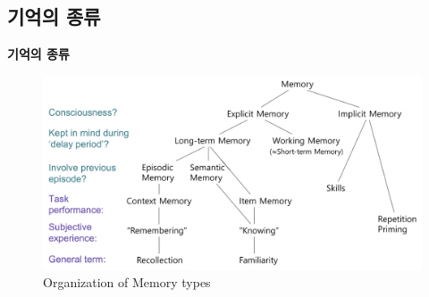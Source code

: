 \documentclass{beamer}
\begin{document}
\subsection{기억의 종류}
\begin{frame}{\textbf{기억의 종류}}

  \begin{figure}
    \centering
    \includegraphics[width=\textwidth]{image/memory_tree_2}
    \caption{Organization of Memory types}
  \end{figure}


\end{frame}
\end{document}
